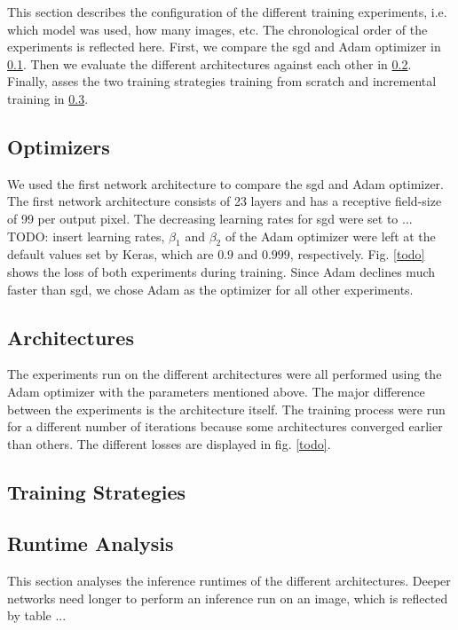 This section describes the configuration of the different training experiments, i.e. which model was used, how many images, etc. The chronological order of the experiments is reflected here. First, we compare the \gls{sgd} and Adam optimizer in \ref{subsection:optimizers}. Then we evaluate the different architectures against each other in \ref{subsection:architectures}. Finally, asses the two training strategies training from scratch and incremental training in \ref{subsection:training_strategies}.

\subsection{Optimizers} \label{subsection:optimizers}

We used the first network architecture to compare the \gls{sgd} and Adam optimizer. The first network architecture consists of 23 layers and has a receptive field-size of 99 per output pixel. The decreasing learning rates for \gls{sgd} were set to ... TODO: insert learning rates, $\beta_1$ and $\beta_2$ of the Adam optimizer were left at the default values set by Keras, which are $0.9$ and $0.999$, respectively. Fig. \ref{todo} shows the loss of both experiments during training. Since Adam declines much faster than \gls{sgd}, we chose Adam as the optimizer for all other experiments.

\subsection{Architectures} \label{subsection:architectures}

The experiments run on the different architectures were all performed using the Adam optimizer with the parameters mentioned above. The major difference between the experiments is the architecture itself. The training process were run for a different number of iterations because some architectures converged earlier than others. The different losses are displayed in fig. \ref{todo}.

\subsection{Training Strategies} \label{subsection:training_strategies}


\subsection{Runtime Analysis}

This section analyses the inference runtimes of the different architectures. Deeper networks need longer to perform an inference run on an image, which is reflected by table ...
